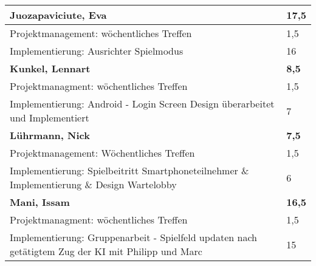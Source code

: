 \documentclass[a4paper,11pt]{scrartcl}
\begin{document}
\begin{longtable}{| p{13.8cm} | C{2.4cm} |}

	\textbf{Juozapaviciute, Eva} & \textbf{17,5}\\ %
	\hline

  Projektmanagement: wöchentliches Treffen
	&
  1,5
	\\
	\hline

  Implementierung: Ausrichter Spielmodus
	&
  16
	\\
	\hline
	\hline


	\textbf{Kunkel, Lennart} & \textbf{8,5}\\ %
	\hline

  Projektmanagment: wöchentliches Treffen
	&
  1,5
	\\
	\hline

  Implementierung: Android - Login Screen Design überarbeitet und Implementiert
	&
  7
	\\
	\hline
	\hline


	\textbf{Lührmann, Nick} & \textbf{7,5}\\ %
	\hline

	Projektmanagement: Wöchentliches Treffen
	&
	1,5
	\\
	\hline

	Implementierung: Spielbeitritt Smartphoneteilnehmer \& Implementierung \& Design Wartelobby
	&
  6
	\\
	\hline
	\hline


	\textbf{Mani, Issam} & \textbf{16,5}\\ %
	\hline

  Projektmanagment: wöchentliches Treffen
	&
  1,5
	\\
	\hline

  Implementierung: Gruppenarbeit - Spielfeld updaten nach getätigtem Zug der KI mit Philipp und Marc
	&
  15
	\\
	\hline
	\hline



\end{longtable}
\end{document}
